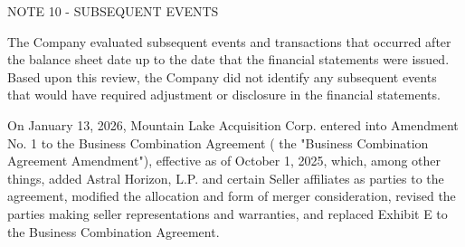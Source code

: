 \documentclass[11pt,a4paper]{article}
\begin{document}
NOTE 10 - SUBSEQUENT EVENTS

The Company evaluated subsequent events and transactions that occurred after the balance sheet date up to the date that the financial statements were issued. Based upon this review, the Company did not identify any subsequent events that would have required adjustment or disclosure in the financial statements.

On January 13, 2026, Mountain Lake Acquisition Corp. entered into Amendment No. 1 to the Business Combination Agreement ( the "Business Combination Agreement Amendment"), effective as of October 1, 2025, which, among other things, added Astral Horizon, L.P. and certain Seller affiliates as parties to the agreement, modified the allocation and form of merger consideration, revised the parties making seller representations and warranties, and replaced Exhibit E to the Business Combination Agreement.
\end{document}
